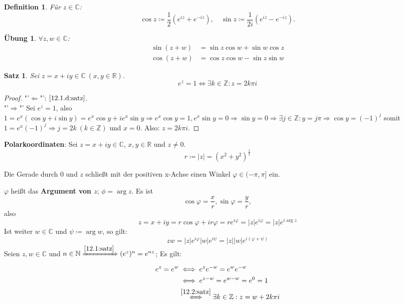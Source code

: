\documentclass[12pt]{extreport} %
\newcommand{\C}{\mathbb{C}}
\newcommand{\N}{\mathbb{N}}
\newcommand{\R}{\mathbb{R}}
\newcommand{\Z}{\mathbb{Z}}
\theoremstyle{named}
\theoremstyle{dotless}
\newtheorem{satz}[unnamedtheorem]{Satz}
\newtheorem*{definition}{Definition}
\newtheorem*{uebung}{Übung}
\begin{document}
\begin{definition}
	Für $z \in \C$:
	$$ \cos z \coloneqq \frac{1}{2} \left( e^{iz} + e^{-iz} \right), \quad \sin z \coloneqq \frac{1}{2 i} \left( e^{iz} - e^{-iz} \right). $$
\end{definition}


\begin{uebung}
	$\forall z, w \in \C$:
	\begin{align*}
		\sin (z + w) & = \sin z \cos w + \sin w \cos z \\
		\cos (z + w) & = \cos z \cos w - \sin z \sin w
	\end{align*}	
\end{uebung}


\begin{satz} \label{12.2:satz}
	Sei $z = x + i y \in \C ~(x, y \in \R)$.
	$$ e^{z} = 1 \iff \exists k \in \Z: z = 2 k \pi i $$
\end{satz}

\begin{proof}
	"'$\Leftarrow$"': $\ref{12.1.d:satz}$. \\
	"'$\Rightarrow$"' Sei $e^{z} = 1$, also $1 = e^{x} ( \cos y + i \sin y) = e^{x} \cos y + i e^{x} \sin y \Rightarrow e^{x} \cos y = 1, e^{x} \sin y = 0 \Rightarrow \sin y = 0 \Rightarrow \exists j \in \Z: y = j \pi \Rightarrow \cos y = (-1)^{j}$ somit $1 = e^{x} (-1)^{j} \Rightarrow j = 2k ~(k \in \Z)$ und $x = 0$. Also: $z = 2k \pi i$.
\end{proof}

 
\textbf{Polarkoordinaten}: Sei $z = x + iy \in \C$, $x, y \in \R$ und $z \neq 0$.
	$$ r \coloneqq |z| = (x^{2} + y^{2})^{\frac{1}{2}} $$
	
	Die Gerade durch $0$ und $z$ schließt mit der positiven x-Achse einen Winkel $\varphi \in (-\pi, \pi]$ ein.
	
	$\varphi$ hei{\ss}t das \textbf{Argument von $z$}; $\phi = \arg z$. Es ist
		$$ \cos \varphi = \frac{x}{r}, \sin \varphi = \frac{y}{r}, $$
	also
		$$  z = x + iy = r \cos \varphi + i r \varphi = r e^{i \varphi} = |z| e^{i \varphi} = |z| e^{i \arg z} $$
	Ist weiter $w \in \C$ und $\psi \coloneqq \arg w$, so gilt:
		$$ z w = |z| e^{i \varphi} |w| e^{i \psi} = |z| |w| e^{i(\varphi + \psi)} $$
	Seien $z, w \in \C$ und $n \in \N \xRightarrow[]{\ref{12.1:satz}} (e^{z})^{n} = e^{nz}$; Es gilt:
	\begin{align*}
		e^{z} = e^{w} & \iff e^{z} e^{-w} = e^{w} e^{-w} \\
			& \iff e^{z-w} = e^{w - w} = e^{0} =1 \\
			& \overset{\ref{12.2:satz}}{\iff} \exists k \in \Z: z = w + 2 k \pi i
	\end{align*}
\end{document}
